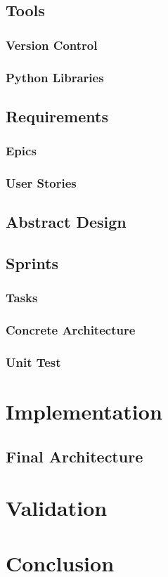\documentclass{article}
\begin{document}
\subsection{Tools}
\subsubsection{Version Control}
\subsubsection{Python Libraries}


\subsection{Requirements}
\subsubsection{Epics}
\subsubsection{User Stories}

\subsection{Abstract Design}

\subsection{Sprints}
\subsubsection{Tasks}
\subsubsection{Concrete Architecture}
\subsubsection{Unit Test}

\section{Implementation}

\subsection{Final Architecture}


\section{Validation}
\section{Conclusion}
{}

\end{document}
